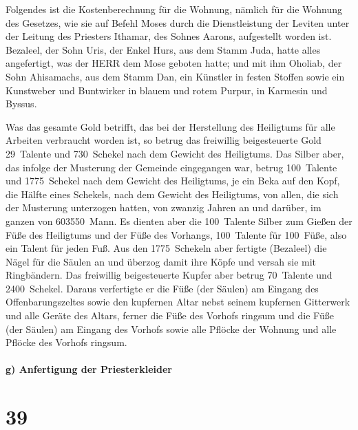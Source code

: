  Folgendes ist die Kostenberechnung für die Wohnung,
nämlich für die Wohnung des Gesetzes, wie sie auf Befehl Moses durch die
Dienstleistung der Leviten unter der Leitung des Priesters Ithamar, des
Sohnes Aarons, aufgestellt worden ist.  Bezaleel, der
Sohn Uris, der Enkel Hurs, aus dem Stamm Juda, hatte alles angefertigt,
was der HERR dem Mose geboten hatte;  und mit ihm
Oholiab, der Sohn Ahisamachs, aus dem Stamm Dan, ein Künstler in festen
Stoffen sowie ein Kunstweber und Buntwirker in blauem und rotem Purpur,
in Karmesin und Byssus.

 Was das gesamte Gold betrifft, das bei der Herstellung
des Heiligtums für alle Arbeiten verbraucht worden ist, so betrug das
freiwillig beigesteuerte Gold 29~Talente und 730~Schekel nach dem
Gewicht des Heiligtums.  Das Silber aber, das infolge der
Musterung der Gemeinde eingegangen war, betrug 100~Talente und
1775~Schekel nach dem Gewicht des Heiligtums,  je ein
Beka auf den Kopf, die Hälfte eines Schekels, nach dem Gewicht des
Heiligtums, von allen, die sich der Musterung unterzogen hatten, von
zwanzig Jahren an und darüber, im ganzen von 603550~Mann.
 Es dienten aber die 100~Talente Silber zum Gießen der
Füße des Heiligtums und der Füße des Vorhangs, 100~Talente für 100~Füße,
also ein Talent für jeden Fuß.  Aus den 1775~Schekeln
aber fertigte (Bezaleel) die Nägel für die Säulen an und überzog damit
ihre Köpfe und versah sie mit Ringbändern.  Das
freiwillig beigesteuerte Kupfer aber betrug 70~Talente und 2400~Schekel.
 Daraus verfertigte er die Füße (der Säulen) am Eingang
des Offenbarungszeltes sowie den kupfernen Altar nebst seinem kupfernen
Gitterwerk und alle Geräte des Altars,  ferner die Füße
des Vorhofs ringsum und die Füße (der Säulen) am Eingang des Vorhofs
sowie alle Pflöcke der Wohnung und alle Pflöcke des Vorhofs ringsum.

\hypertarget{g-anfertigung-der-priesterkleider}{%
\paragraph{g) Anfertigung der
Priesterkleider}\label{g-anfertigung-der-priesterkleider}}

\hypertarget{section-38}{%
\section{39}\label{section-38}}

